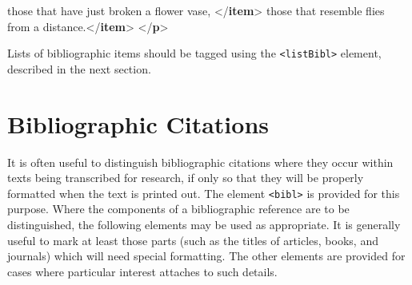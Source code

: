 \documentclass[11pt,twoside]{article}\makeatletter
\makeatletter
\renewcommand\section{\@startsection {section}{1}{\z@}%
     {-1.75ex \@plus -0.5ex \@minus -.2ex}%
     {0.5ex \@plus .2ex}%
     {\reset@font\Large\bfseries\sffamily}}
\def\DivI{\section}
\def\DivI{\chapter}
\makeatother
\begin{document}
\begin{shaded}
\hspace*{6pt} those that have just broken a flower\mbox{}\newline 
\hspace*{6pt}\hspace*{6pt}\hspace*{6pt}\hspace*{6pt} vase, {</\textbf{item}>}\mbox{}\newline 
\hspace*{6pt} those that resemble flies from a\mbox{}\newline 
\hspace*{6pt}\hspace*{6pt}\hspace*{6pt}\hspace*{6pt} distance.{</\textbf{item}>}\mbox{}\newline 
{}\mbox{}\newline 
{</\textbf{p}>}\end{shaded}\egroup\par \par
Lists of bibliographic items should be tagged using the \texttt{<listBibl>} element, described in the next section.
\DivI[Bibliographic Citations]{Bibliographic Citations}\label{U5-bibls}\par
It is often useful to distinguish bibliographic citations where they occur within texts being transcribed for research, if only so that they will be properly formatted when the text is printed out. The element \texttt{<bibl>} is provided for this purpose.  Where the components of a bibliographic reference are to be distinguished, the following elements may be used as appropriate. It is generally useful to mark at least those parts (such as the titles of articles, books, and journals) which will need special formatting.  The other elements are provided for cases where particular interest attaches to such details. \par
\end{document}
